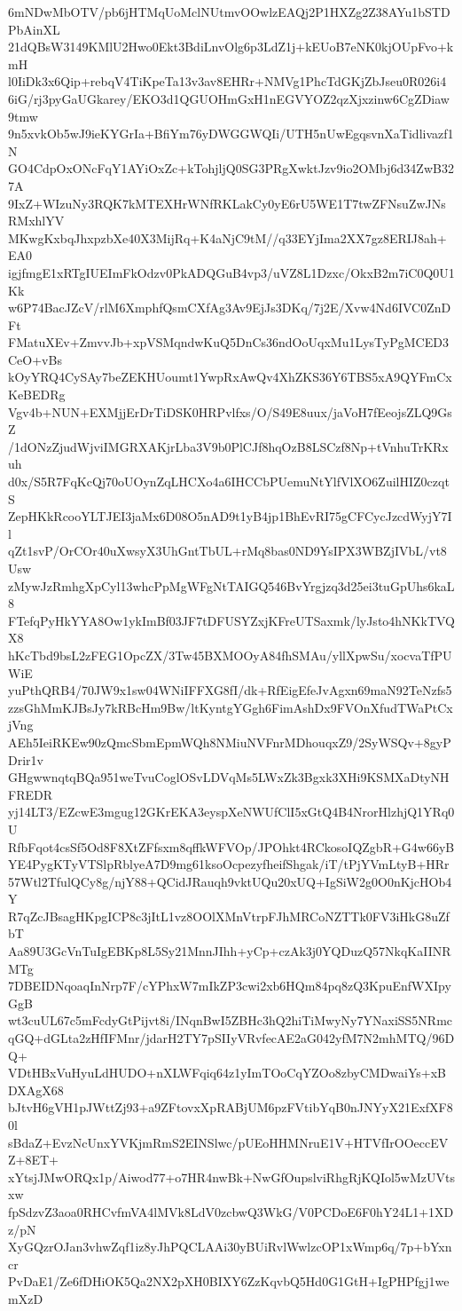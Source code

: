 6mNDwMbOTV/pb6jHTMqUoMclNUtmvOOwlzEAQj2P1HXZg2Z38AYu1bSTDPbAinXL
21dQBsW3149KMlU2Hwo0Ekt3BdiLnvOlg6p3LdZ1j+kEUoB7eNK0kjOUpFvo+kmH
l0IiDk3x6Qip+rebqV4TiKpeTa13v3av8EHRr+NMVg1PhcTdGKjZbJseu0R026i4
6iG/rj3pyGaUGkarey/EKO3d1QGUOHmGxH1nEGVYOZ2qzXjxzinw6CgZDiaw9tmw
9n5xvkOb5wJ9ieKYGrIa+BfiYm76yDWGGWQIi/UTH5nUwEgqsvnXaTidlivazf1N
GO4CdpOxONcFqY1AYiOxZc+kTohjljQ0SG3PRgXwktJzv9io2OMbj6d34ZwB327A
9IxZ+WIzuNy3RQK7kMTEXHrWNfRKLakCy0yE6rU5WE1T7twZFNsuZwJNsRMxhlYV
MKwgKxbqJhxpzbXe40X3MijRq+K4aNjC9tM//q33EYjIma2XX7gz8ERIJ8ah+EA0
igjfmgE1xRTgIUEImFkOdzv0PkADQGuB4vp3/uVZ8L1Dzxc/OkxB2m7iC0Q0U1Kk
w6P74BacJZcV/rlM6XmphfQsmCXfAg3Av9EjJs3DKq/7j2E/Xvw4Nd6IVC0ZnDFt
FMatuXEv+ZmvvJb+xpVSMqndwKuQ5DnCs36ndOoUqxMu1LysTyPgMCED3CeO+vBs
kOyYRQ4CySAy7beZEKHUoumt1YwpRxAwQv4XhZKS36Y6TBS5xA9QYFmCxKeBEDRg
Vgv4b+NUN+EXMjjErDrTiDSK0HRPvlfxs/O/S49E8uux/jaVoH7fEeojsZLQ9GsZ
/1dONzZjudWjviIMGRXAKjrLba3V9b0PlCJf8hqOzB8LSCzf8Np+tVnhuTrKRxuh
d0x/S5R7FqKcQj70oUOynZqLHCXo4a6IHCCbPUemuNtYlfVlXO6ZuilHIZ0czqtS
ZepHKkRcooYLTJEI3jaMx6D08O5nAD9t1yB4jp1BhEvRI75gCFCycJzcdWyjY7Il
qZt1svP/OrCOr40uXwsyX3UhGntTbUL+rMq8bas0ND9YsIPX3WBZjIVbL/vt8Usw
zMywJzRmhgXpCyl13whcPpMgWFgNtTAIGQ546BvYrgjzq3d25ei3tuGpUhs6kaL8
FTefqPyHkYYA8Ow1ykImBf03JF7tDFUSYZxjKFreUTSaxmk/lyJsto4hNKkTVQX8
hKcTbd9bsL2zFEG1OpcZX/3Tw45BXMOOyA84fhSMAu/yllXpwSu/xocvaTfPUWiE
yuPthQRB4/70JW9x1sw04WNiIFFXG8fI/dk+RfEigEfeJvAgxn69maN92TeNzfs5
zzsGhMmKJBsJy7kRBcHm9Bw/ltKyntgYGgh6FimAshDx9FVOnXfudTWaPtCxjVng
AEh5IeiRKEw90zQmcSbmEpmWQh8NMiuNVFnrMDhouqxZ9/2SyWSQv+8gyPDrir1v
GHgwwnqtqBQa951weTvuCoglOSvLDVqMs5LWxZk3Bgxk3XHi9KSMXaDtyNHFREDR
yj14LT3/EZcwE3mgug12GKrEKA3eyspXeNWUfClI5xGtQ4B4NrorHlzhjQ1YRq0U
RfbFqot4csSf5Od8F8XtZFfsxm8qffkWFVOp/JPOhkt4RCkosoIQZgbR+G4w66yB
YE4PygKTyVTSlpRblyeA7D9mg61ksoOcpezyfheifShgak/iT/tPjYVmLtyB+HRr
57Wtl2TfulQCy8g/njY88+QCidJRauqh9vktUQu20xUQ+IgSiW2g0O0nKjcHOb4Y
R7qZcJBsagHKpgICP8c3jItL1vz8OOlXMnVtrpFJhMRCoNZTTk0FV3iHkG8uZfbT
Aa89U3GcVnTuIgEBKp8L5Sy21MnnJIhh+yCp+czAk3j0YQDuzQ57NkqKaIINRMTg
7DBEIDNqoaqInNrp7F/cYPhxW7mIkZP3cwi2xb6HQm84pq8zQ3KpuEnfWXIpyGgB
wt3cuUL67c5mFcdyGtPijvt8i/INqnBwI5ZBHc3hQ2hiTiMwyNy7YNaxiSS5NRmc
qGQ+dGLta2zHfIFMnr/jdarH2TY7pSIIyVRvfecAE2aG042yfM7N2mhMTQ/96DQ+
VDtHBxVuHyuLdHUDO+nXLWFqiq64z1yImTOoCqYZOo8zbyCMDwaiYs+xBDXAgX68
bJtvH6gVH1pJWttZj93+a9ZFtovxXpRABjUM6pzFVtibYqB0nJNYyX21ExfXF80l
sBdaZ+EvzNcUnxYVKjmRmS2EINSlwc/pUEoHHMNruE1V+HTVfIrOOeccEVZ+8ET+
xYtsjJMwORQx1p/Aiwod77+o7HR4nwBk+NwGfOupslviRhgRjKQIol5wMzUVtsxw
fpSdzvZ3aoa0RHCvfmVA4lMVk8LdV0zcbwQ3WkG/V0PCDoE6F0hY24L1+1XDz/pN
XyGQzrOJan3vhwZqf1iz8yJhPQCLAAi30yBUiRvlWwlzcOP1xWmp6q/7p+bYxncr
PvDaE1/Ze6fDHiOK5Qa2NX2pXH0BIXY6ZzKqvbQ5Hd0G1GtH+IgPHPfgj1wemXzD

